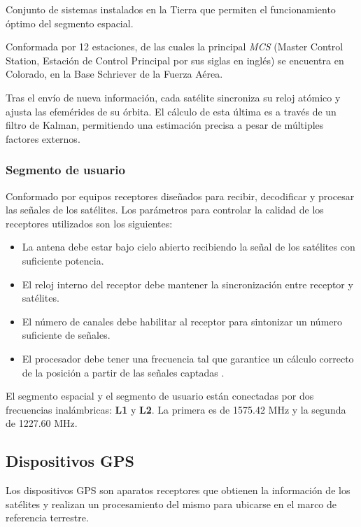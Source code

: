 Conjunto de sistemas instalados en la Tierra que permiten el funcionamiento óptimo del segmento espacial.

Conformada por 12 estaciones, de las cuales la principal \textit{MCS} (Master Control Station, Estación de Control Principal por sus siglas en inglés) se encuentra en Colorado, en la Base Schriever de la Fuerza Aérea.	

Tras el envío de nueva información, cada satélite sincroniza su reloj atómico y ajusta las efemérides de su órbita. El cálculo de esta última es a través de un filtro de Kalman, permitiendo una estimación precisa a pesar de múltiples factores externos.

\subsubsection{Segmento de usuario}

Conformado por equipos receptores diseñados para recibir, decodificar y procesar las señales de los satélites. Los parámetros para controlar la calidad de los receptores utilizados son los siguientes:

\begin{itemize}
	\item La antena debe estar bajo cielo abierto recibiendo la señal de los satélites con suficiente potencia.
	\item El reloj interno del receptor debe mantener la sincronización entre receptor y satélites.
	\item El número de canales debe habilitar al receptor para sintonizar un número suficiente de señales.
	\item El procesador debe tener una frecuencia tal que garantice un cálculo correcto de la posición a partir de las señales captadas \cite{termal2014prototipo}.	
\end{itemize}

El segmento espacial y el segmento de usuario están conectadas por dos frecuencias inalámbricas: \textbf{L1} y \textbf{L2}. La primera es de 1575.42 MHz y la segunda de 1227.60 MHz\cite{farrell2008aided}.

\subsection{Dispositivos GPS}
Los dispositivos GPS son aparatos receptores que obtienen la información de los satélites y realizan un procesamiento del mismo para ubicarse en el marco de referencia terrestre. \\

